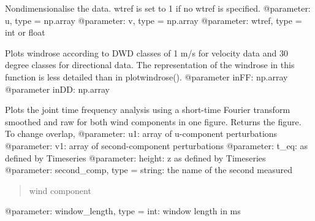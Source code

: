 \documentclass[letterpaper,10pt,english]{sphinxmanual}
\begin{document}

\begin{fulllineitems}
\label{\detokenize{index:windtunnel.nondimensionalise}}
Nondimensionalise the data. wtref is set to 1 if no wtref is 
specified.
@parameter: u, type = np.array
@parameter: v, type = np.array
@parameter: wtref, type = int or float

\end{fulllineitems}


\begin{fulllineitems}
\label{\detokenize{index:windtunnel.plot_DWD_windrose}}
Plots windrose according to DWD classes of 1 m/s for velocity data and
30 degree classes for directional data. The representation of the windrose 
in this function is less detailed than in plotwindrose().
@parameter inFF: np.array
@parameter inDD: np.array

\end{fulllineitems}


\begin{fulllineitems}
\label{\detokenize{index:windtunnel.plot_JTFA_STFT}}
Plots the joint time frequency analysis using a short-time Fourier
transform smoothed and raw for both wind components in one figure. Returns
the figure. To change overlap, 
@parameter: u1: array of u-component perturbations
@parameter: v1: array of second-component perturbations
@parameter: t\_eq: as defined by Timeseries
@parameter: height: z as defined by Timeseries
@parameter: second\_comp, type = string: the name of the second measured
\begin{quote}

wind component
\end{quote}

@parameter: window\_length, type = int: window length in ms

\end{fulllineitems}
\end{document}
